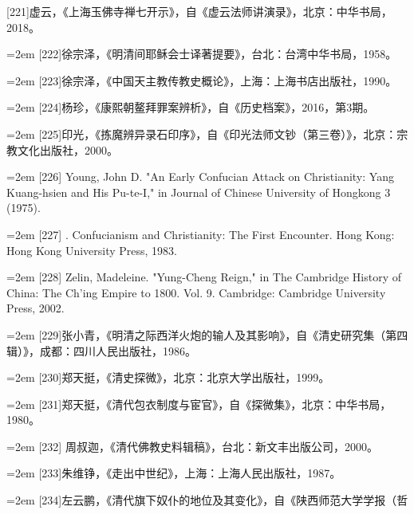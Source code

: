 [221]虚云，《上海玉佛寺禅七开示》，自《虚云法师讲演录》，北京：中华书局，%
2018。%
\par
\noindent\hangindent=2em
[222]徐宗泽，《明清间耶稣会士译著提要》，台北：台湾中华书局，1958。%
\par
\noindent\hangindent=2em
[223]徐宗泽，《中国天主教传教史概论》，上海：上海书店出版社，1990。%
\par
\noindent\hangindent=2em
[224]杨珍，《康熙朝鳌拜罪案辨析》，自《历史档案》，2016，第3期。%
\par
\noindent\hangindent=2em
[225]印光，《拣魔辨异录石印序》，自《印光法师文钞（第三卷）》，北京：宗%
教文化出版社，2000。%
\par
\noindent\hangindent=2em
[226] Young, John D. "An Early Confucian Attack on Christianity: Yang Kuang-hsien%
\space%
and His Pu-te-I," in Journal of Chinese University of Hongkong 3 (1975).%
\par
\noindent\hangindent=2em
[227] . Confucianism and Christianity: The First Encounter. Hong Kong: Hong%
\space%
Kong University Press, 1983.%
\par
\noindent\hangindent=2em
[228] Zelin, Madeleine. "Yung-Cheng Reign," in The Cambridge History of China: The%
\space%
Ch’ing Empire to 1800. Vol. 9. Cambridge: Cambridge University Press, 2002.%
\par
\noindent\hangindent=2em
[229]张小青，《明清之际西洋火炮的输人及其影响》，自《清史研究集（第四%
辑）》，成都：四川人民出版社，1986。%
\par
\noindent\hangindent=2em
[230]郑天挺，《清史探微》，北京：北京大学出版社，1999。%
\par
\noindent\hangindent=2em
[231]郑天挺，《清代包衣制度与宦官》，自《探微集》，北京：中华书局，1980。%
\par
\noindent\hangindent=2em
[232] 周叔迦，《清代佛教史料辑稿》，台北：新文丰出版公司，2000。%
\par
\noindent\hangindent=2em
[233]朱维铮，《走出中世纪》，上海：上海人民出版社，1987。%
\par
\noindent\hangindent=2em
[234]左云鹏，《清代旗下奴仆的地位及其变化》，自《陕西师范大学学报（哲%
